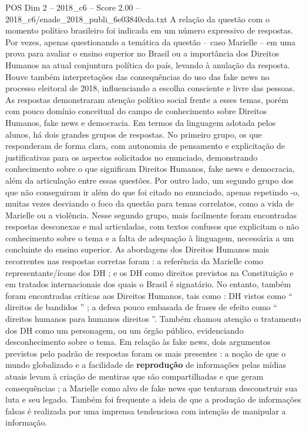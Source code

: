 \begin{textsample}{POS Dim 2 – 2018\_c6 – Score 2.00 – 2018\_c6/enade\_2018\_publi\_6e03840cda.txt}
A relação da questão com o momento político brasileiro foi indicada em um número expressivo de respostas.
Por vezes, apenas questionando a temática da questão – caso Marielle – em uma prova para avaliar o ensino superior no Brasil ou a importância dos Direitos Humanos na atual conjuntura política do país, levando à anulação da resposta.
Houve também interpretações das consequências do uso das fake news no processo eleitoral de 2018, influenciando a escolha consciente e livre das pessoas.
As respostas demonstraram atenção político social frente a esses temas, porém com pouco domínio conceitual do campo de conhecimento sobre Direitos Humanos, fake news e democracia.
Em termos da linguagem adotada pelos alunos, há dois grandes grupos de respostas.
No primeiro grupo, os que responderam de forma clara, com autonomia de pensamento e explicitação de justificativas para os aspectos solicitados no enunciado, demonstrando conhecimento sobre o que significam Direitos Humanos, fake news e democracia, além da articulação entre essas questões.
Por outro lado, um segundo grupo dos que não conseguiram ir além do que foi citado no enunciado, apenas repetindo -o, muitas vezes desviando o foco da questão para temas correlatos, como a vida de Marielle ou a violência.
Nesse segundo grupo, mais facilmente foram encontradas respostas desconexas e mal articuladas, com textos confusos que explicitam o não conhecimento sobre o tema e a falta de adequação à linguagem, necessária a um concluinte do ensino superior.
As abordagens dos Direitos Humanos mais recorrentes nas respostas corretas foram : a referência da Marielle como representante/ícone dos DH ; e os DH como direitos previstos na Constituição e em tratados internacionais dos quais o Brasil é signatário.
No entanto, também foram encontradas críticas aos Direitos Humanos, tais como : DH vistos como “ direitos de bandidos ” ; a defesa pouco embasada de frases de efeito como “ direitos humanos para humanos direitos ”.
Também chamou atenção o tratamento dos DH como um personagem, ou um órgão público, evidenciando desconhecimento sobre o tema.
Em relação às fake news, dois argumentos previstos pelo padrão de respostas foram os mais presentes : a noção de que o mundo globalizado e a facilidade de \textbf{reprodução} de informações pelas mídias atuais levam à criação de mentiras que são compartilhadas e que geram consequências ; a Marielle como alvo de fake news que tentaram desconstruir sua luta e seu legado.
Também foi frequente a ideia de que a produção de informações falsas é realizada por uma imprensa tendenciosa com intenção de manipular a informação.

\end{textsample}
